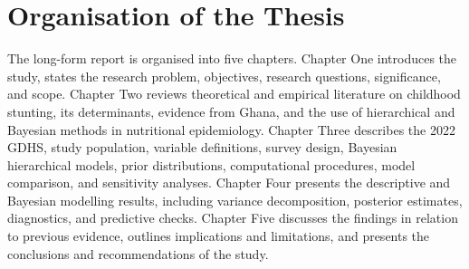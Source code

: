 \section{Organisation of the Thesis}

The long-form report is organised into five chapters. Chapter One introduces the study, states the research problem, objectives, research questions, significance, and scope. Chapter Two reviews theoretical and empirical literature on childhood stunting, its determinants, evidence from Ghana, and the use of hierarchical and Bayesian methods in nutritional epidemiology. Chapter Three describes the 2022 GDHS, study population, variable definitions, survey design, Bayesian hierarchical models, prior distributions, computational procedures, model comparison, and sensitivity analyses. Chapter Four presents the descriptive and Bayesian modelling results, including variance decomposition, posterior estimates, diagnostics, and predictive checks. Chapter Five discusses the findings in relation to previous evidence, outlines implications and limitations, and presents the conclusions and recommendations of the study.
